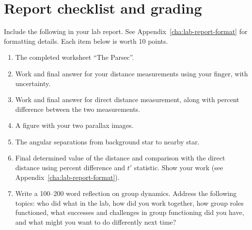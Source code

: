 \section{Report checklist and grading}

Include the following in your lab report. See Appendix~\ref{cha:lab-report-format} for formatting details. Each item below is worth 10 points.

\begin{enumerate}
	\item The completed worksheet ``The Parsec''.
	\item Work and final answer for your distance measurements using your finger, with uncertainty.
	\item Work and final answer for direct distance measurement, along with percent difference between the two measurements.
	\item A figure with your two parallax images.
	\item The angular separations from background star to nearby star.
	\item Final determined value of the distance and comparison with the direct distance using percent difference and $t'$ statistic. Show your work (see Appendix~\ref{cha:lab-report-format}).
	\item Write a 100--200 word reflection on group dynamics. Address the following topics: who did what in the lab, how did you work together, how group roles functioned, what successes and challenges in group functioning did you have, and what might you want to do differently next time?
\end{enumerate}